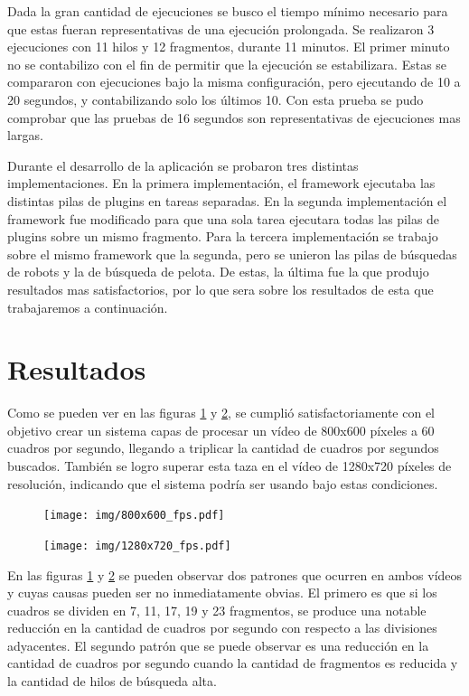 Dada la gran cantidad de ejecuciones se busco el tiempo mínimo necesario para
que estas fueran representativas de una ejecución prolongada. Se realizaron 3
ejecuciones con 11 hilos y 12 fragmentos, durante 11 minutos. El primer minuto
no se contabilizo con el fin de permitir que la ejecución se estabilizara.
Estas se compararon con ejecuciones bajo la misma configuración, pero ejecutando
de 10 a 20 segundos, y contabilizando solo los últimos 10. Con esta prueba se
pudo comprobar que las pruebas de 16 segundos son representativas de ejecuciones
mas largas.

Durante el desarrollo de la aplicación se probaron tres distintas
implementaciones. En la primera implementación, el framework ejecutaba las
distintas pilas de plugins en tareas separadas. En la segunda implementación el
framework fue modificado para que una sola tarea ejecutara todas las pilas de
plugins sobre un mismo fragmento. Para la tercera implementación se trabajo
sobre el mismo framework que la segunda, pero se unieron las pilas de búsquedas
de robots y la de búsqueda de pelota. De estas, la última fue la que produjo
resultados mas satisfactorios, por lo que sera sobre los resultados de esta que
trabajaremos a continuación.

\section{Resultados}

Como se pueden ver en las figuras \ref{800fps} y \ref{1280fps}, se cumplió
satisfactoriamente con el objetivo crear un sistema capas de procesar un vídeo
de 800x600 píxeles a 60 cuadros por segundo, llegando a triplicar la cantidad de
cuadros por segundos buscados. También se logro superar esta taza en el vídeo de
1280x720 píxeles de resolución, indicando que el sistema podría ser usando bajo
estas condiciones.

\begin{figure}[!h]

	\texttt{[image: img/800x600\_fps.pdf]}
	\caption{}
	\label{800fps}

\end{figure}

\begin{figure}[!h]

	\texttt{[image: img/1280x720\_fps.pdf]}
	\caption{}
	\label{1280fps}

\end{figure}

En las figuras \ref{800fps} y \ref{1280fps} se pueden observar dos patrones que
ocurren en ambos vídeos y cuyas causas pueden ser no inmediatamente obvias. El
primero es que si los cuadros se dividen en 7, 11, 17, 19 y 23 fragmentos, se
produce una notable reducción en la cantidad de cuadros por segundo con respecto
a las divisiones adyacentes. El segundo patrón que se puede observar es una
reducción en la cantidad de cuadros por segundo cuando la cantidad de fragmentos
es reducida y la cantidad de hilos de búsqueda alta.

